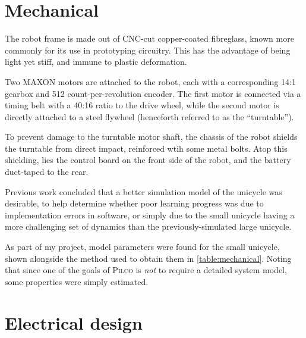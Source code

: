 \documentclass[main.tex]{subfiles}
\begin{document}
\section{Mechanical}

	The robot frame is made out of CNC-cut copper-coated fibreglass, known more commonly for its use in prototyping circuitry.
	This has the advantage of being light yet stiff, and immune to plastic deformation.

	Two MAXON motors\cite{motor} are attached to the robot, each with a corresponding 14:1 gearbox\cite{gearbox} and 512 count-per-revolution encoder\cite{encoder}.
	The first motor is connected via a timing belt with a 40:16 ratio to the drive wheel, while the second motor is directly attached to a steel flywheel (henceforth referred to as the \enquote{turntable}).

	To prevent damage to the turntable motor shaft, the chassis of the robot shields the turntable from direct impact, reinforced wtih some metal bolts.
	Atop this shielding, lies the control board on the front side of the robot, and the battery duct-taped to the rear.

	Previous work concluded \cite[p.~54]{aleksi} that a better simulation model of the unicycle was desirable, to help determine whether poor learning progress was due to implementation errors in software, or simply due to the small unicycle having a more challenging set of dynamics than the previously-simulated large unicycle.

	As part of my project, model parameters were found for the small unicycle, shown alongside the method used to obtain them in \cref{table:mechanical}.
	Noting that since one of the goals of \textsc{Pilco} is \emph{not} to require a detailed system model, some properties were simply estimated.

	\begin{table}
		
		\label{table:mechanical}
	\end{table}



\section{Electrical design}
\end{document}
